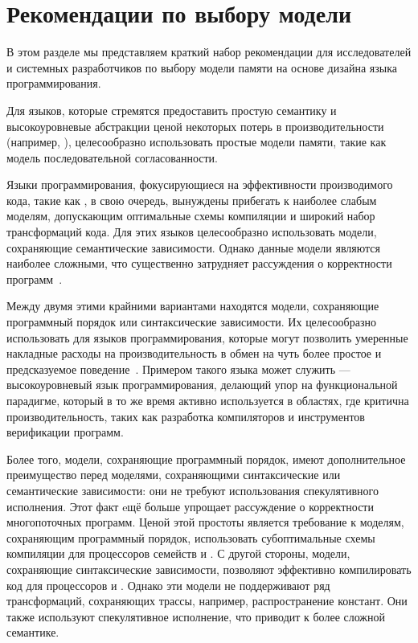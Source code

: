 \section{Рекомендации по выбору модели}
\label{sec:discussion}

В этом разделе мы  представляем краткий набор рекомендации для 
исследователей и системных разработчиков 
по выбору модели памяти на основе дизайна языка программирования.

Для языков, которые стремятся предоставить простую семантику 
и высокоуровневые абстракции ценой некоторых потерь в 
производительности (например, \Haskell), 
целесообразно использовать простые модели памяти, такие как 
модель последовательной согласованности. 

Языки программирования, фокусирующиеся на 
эффективности производимого кода, 
такие как \CPP, в свою очередь, вынуждены 
прибегать к наиболее слабым моделям, 
допускающим оптимальные схемы компиляции и 
широкий набор трансформаций кода. 
Для этих языков целесообразно использовать
модели, сохраняющие семантические зависимости. 
Однако данные модели являются наиболее сложными, 
что существенно затрудняет рассуждения о 
корректности программ~\cite{Svendsen-al:ESOP18}. 

Между двумя этими крайними вариантами  находятся модели, 
сохраняющие программный порядок или синтаксические зависимости. 
Их целесообразно использовать для языков программирования, 
которые могут позволить умеренные накладные 
расходы на производительность в обмен 
на чуть более простое и предсказуемое поведение~\cite{Ou-Demsky:OOPSLA18}. 
Примером такого языка может служить \OCaml --- 
высокоуровневый язык программирования, делающий упор 
на функциональной парадигме, который в то же время 
активно используется в областях, где критична производительность, 
таких как разработка компиляторов и инструментов верификации программ. 

Более того, модели, сохраняющие программный порядок, 
имеют дополнительное преимущество перед моделями, 
сохраняющими синтаксические или семантические зависимости: они не требуют использования 
спекулятивного исполнения. 
Этот факт eщё больше упрощает рассуждение о корректности многопоточных программ. 
Ценой этой простоты является требование к моделям, сохраняющим программный порядок, 
использовать субоптимальные схемы компиляции 
для процессоров семейств \ARM и \POWER.
С другой стороны, модели, сохраняющие синтаксические зависимости, 
позволяют эффективно компилировать код для процессоров \ARM и \POWER. Однако
эти модели не поддерживают ряд трансформаций, 
сохраняющих трассы, например, распространение констант. 
Они также используют спекулятивное исполнение, 
что приводит к более сложной семантике.  

